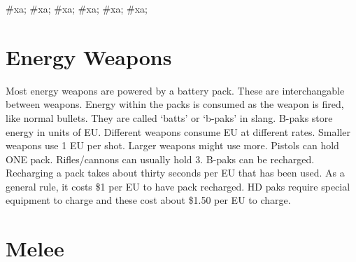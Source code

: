 \documentclass[twoside]{book}
\begin{document}
\begin{multicols}{2}
\#xa;
\#xa;
\vspace{1ex}
    \hspace{-2ex}
\#xa;
\#xa;
\vspace{1ex}
    \hspace{-2ex}
\#xa;
\#xa;
\vspace{1ex}
    
\end{multicols}
  
    

\section{Energy Weapons}
    
    {  
      Most energy weapons are powered by a battery pack.
             These are interchangable between weapons. Energy within the
             packs is consumed as the weapon is fired, like normal
             bullets. They are called `batts' or
             `b-paks' in slang. B-paks store energy in units
             of EU. Different weapons consume EU at different rates.
             Smaller weapons use 1 EU per shot. Larger weapons might use
             more. Pistols can hold ONE pack. Rifles/cannons can usually
             hold 3. B-paks can be recharged. Recharging a pack takes
             about thirty seconds per EU that has been used. As a general
             rule, it costs \$1 per EU to have pack recharged. HD paks
             require special equipment to charge and these cost about
             \$1.50 per EU to charge. 
    }
  
    

\section{Melee}
    
\end{document}
